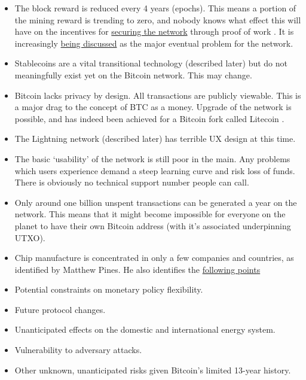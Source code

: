 \begin{itemize}
\item The block reward is reduced every 4 years (epochs). This means a portion of the mining reward is trending to zero, and nobody knows what effect this will have on the incentives for \href{https://www.truthcoin.info/blog/security-budget-ii-mm/}{securing the network} through proof of work \cite{carlsten2016instability}. It is increasingly \href{https://cryptostackers.substack.com/p/bitcoin-is-not-a-store-of-value?sd=pf&s=r}{being discussed} as the major eventual problem for the network.
\item Stablecoins are a vital transitional technology (described later) but do not meaningfully exist yet on the Bitcoin network. This may change.
\item Bitcoin lacks privacy by design. All transactions are publicly viewable. This is a major drag to the concept of BTC as a money. Upgrade of the network is possible, and has indeed been achieved for a Bitcoin fork called Litecoin \cite{fuchsbauer2019aggregate}. 
\item The Lightning network (described later) has terrible UX design at this time. 
\item The basic `usability' of the network is still poor in the main. Any problems which users experience demand a steep learning curve and risk loss of funds. There is obviously no technical support number people can call. 
\item Only around one billion unspent transactions can be generated a year on the network. This means that it might become impossible for everyone on the planet to have their own Bitcoin address (with it's associated underpinning UTXO).  
\item Chip manufacture is concentrated in only a few companies and countries, as identified by Matthew Pines. He also identifies the \href{https://www.btcpolicy.org/#Research}{following points}
\item Potential constraints on monetary policy flexibility.
\item Future protocol changes.
\item Unanticipated effects on the domestic and international energy system.
\item Vulnerability to adversary attacks.
\item Other unknown, unanticipated risks given Bitcoin’s limited 13-year history.
\end{itemize} 


%
